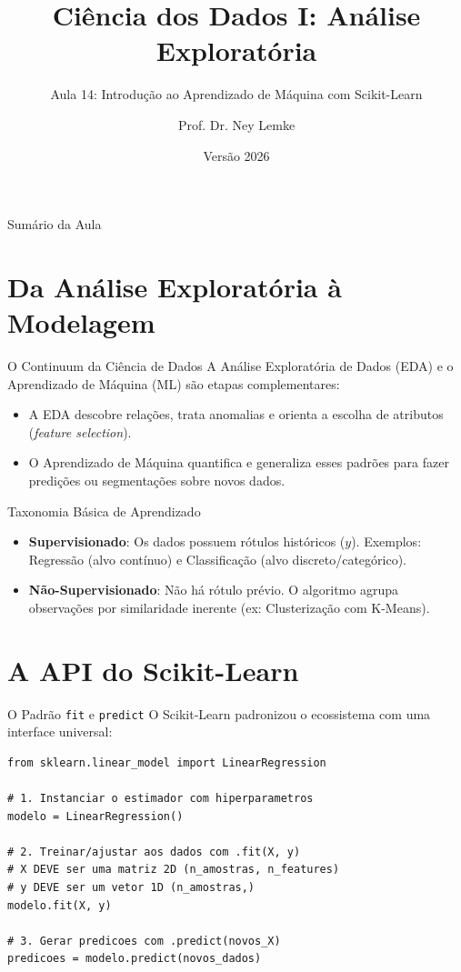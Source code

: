 \documentclass[aspectratio=169, 10pt]{beamer}
\title[Aula 14 - Machine Learning Intro]{Ciência dos Dados I: Análise Exploratória}
\subtitle{Aula 14: Introdução ao Aprendizado de Máquina com Scikit-Learn}
\author{Prof. Dr. Ney Lemke}
\institute{UNESP -- Instituto de Biociências de Botucatu}
\date{Versão 2026}
\begin{document}
\frame{\titlepage}

\begin{frame}{Sumário da Aula}
  \tableofcontents
\end{frame}

\section{Da Análise Exploratória à Modelagem}

\begin{frame}{O Continuum da Ciência de Dados}
  A Análise Exploratória de Dados (EDA) e o Aprendizado de Máquina (ML) são etapas complementares:
  \begin{itemize}
    \item A EDA descobre relações, trata anomalias e orienta a escolha de atributos (\textit{feature selection}).
    \item O Aprendizado de Máquina quantifica e generaliza esses padrões para fazer predições ou segmentações sobre novos dados.
  \end{itemize}
  \begin{block}{Taxonomia Básica de Aprendizado}
    \begin{itemize}
      \item \textbf{Supervisionado}: Os dados possuem rótulos históricos ($y$). Exemplos: Regressão (alvo contínuo) e Classificação (alvo discreto/categórico).
      \item \textbf{Não-Supervisionado}: Não há rótulo prévio. O algoritmo agrupa observações por similaridade inerente (ex: Clusterização com K-Means).
    \end{itemize}
  \end{block}
\end{frame}

\section{A API do Scikit-Learn}

\begin{frame}[fragile]{O Padrão \texttt{fit} e \texttt{predict}}
  O Scikit-Learn padronizou o ecossistema com uma interface universal:
  \begin{lstlisting}
from sklearn.linear_model import LinearRegression

# 1. Instanciar o estimador com hiperparametros
modelo = LinearRegression()

# 2. Treinar/ajustar aos dados com .fit(X, y)
# X DEVE ser uma matriz 2D (n_amostras, n_features)
# y DEVE ser um vetor 1D (n_amostras,)
modelo.fit(X, y)

# 3. Gerar predicoes com .predict(novos_X)
predicoes = modelo.predict(novos_dados)
  \end{lstlisting}
\end{frame}
\end{document}
